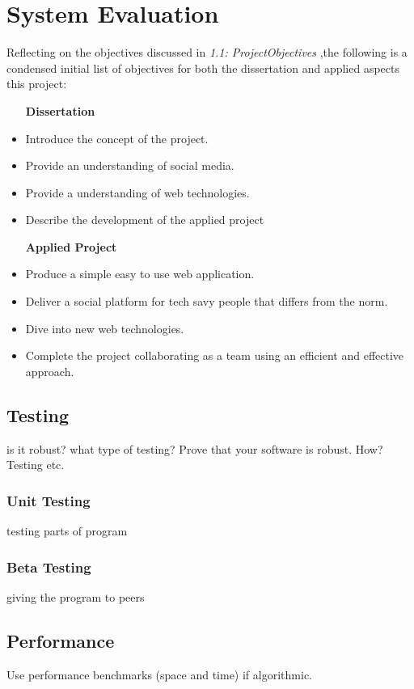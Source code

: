 \chapter{System Evaluation}
Reﬂecting on the objectives discussed in \textit{1.1: ProjectObjectives} ,the following is a condensed initial list of objectives for both the dissertation and applied aspects this project: 

\begin{itemize}
\item [\textbf{Dissertation}]
\item Introduce the concept of the project. 
\item Provide an understanding of social media.
\item Provide a understanding of web technologies.
\item Describe the development of the applied project
\end{itemize}
 
\begin{itemize}
\item [\textbf{Applied Project}]
\item Produce a simple easy to use web application.
\item Deliver a social platform for tech savy people that differs from the norm.
\item Dive into new web technologies.
\item Complete the project collaborating as a team using an efficient and effective approach.
\end{itemize}



\section{Testing}
is it robust?
what type of testing?
 Prove that your software is robust. How? Testing etc. 
\subsection{Unit Testing}
testing parts of program
\subsection{Beta Testing}
giving the program to peers

\section{Performance}
Use performance benchmarks (space and time) if algorithmic.

